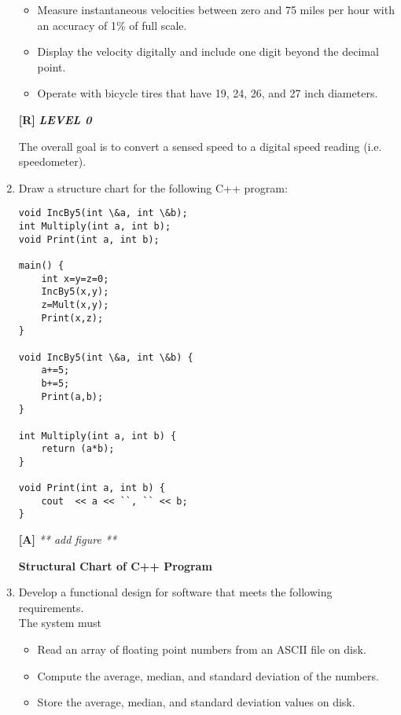 \begin{enumerate}
\begin{itemize}
\item
  Measure instantaneous velocities between zero and 75 miles per hour
  with an accuracy of 1\% of full scale.
\item
  Display the velocity digitally and include one digit beyond the
  decimal point.
\item
  Operate with bicycle tires that have 19, 24, 26, and 27 inch
  diameters.
\end{itemize}

\begin{onlysolution}
  \textbf{[R]}
  \itshape
  \textbf{LEVEL 0}

  The overall goal is to convert a sensed speed to a digital speed reading 
  (i.e. speedometer).


\end{onlysolution}

  \item
    Draw a structure chart for the following C++ program:
\begin{verbatim}
void IncBy5(int \&a, int \&b);
int Multiply(int a, int b);
void Print(int a, int b);

main() {
    int x=y=z=0;
    IncBy5(x,y);
    z=Mult(x,y);
    Print(x,z);
}

void IncBy5(int \&a, int \&b) {
    a+=5;
    b+=5;
    Print(a,b);
}

int Multiply(int a, int b) {
    return (a*b);
}

void Print(int a, int b) {
    cout  << a << ``, `` << b;
}
\end{verbatim}

\begin{onlysolution}
  \textbf{[A]}
  \itshape
  ** add figure **
  \begin{center}
    \textbf{Structural Chart of C++ Program}
  \end{center}
\end{onlysolution}

\item
  Develop a functional design for software that meets the following
  requirements. \\
The system must

\begin{itemize}
\item
  Read an array of floating point numbers from an ASCII file on disk.
\item
  Compute the average, median, and standard deviation of the numbers.
\item
  Store the average, median, and standard deviation values on disk.
\end{itemize}


\end{enumerate}
